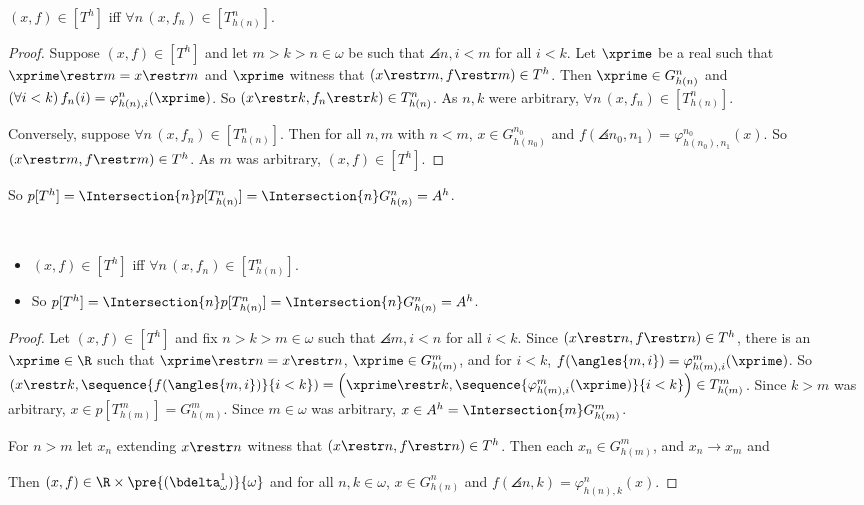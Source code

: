 \documentclass[oneside,12pt]{amsart}
\begin{document}
\begin{proposition}
$(x,f) \in [T^h]$ iff $\forall n \, (x,f_n)\in[T^n_{h(n)}]$.
\end{proposition}
\begin{proof}
Suppose $(x,f) \in [T^h]$ and let $m > k > n \in \omega$
be such that $\angles{n,i}<m$ for all $i<k$. Let $\xprime$ be a real
such that $\xprime\restr m = x \restr m$ and $\xprime$ witness that
$(x\restr m, f\restr m)\in T^h$. Then $\xprime\in G^n_{h(n)}$
and $(\forall i < k)\, f_n(i)=\varphi^{n}_{h(n),i}(\xprime)$.
So $(x\restr k, f_n\restr k)\in T^n_{h(n)}$.
As $n,k$ were arbitrary, $\forall n \, (x,f_n)\in[T^n_{h(n)}]$.

Conversely, suppose $\forall n \, (x,f_n)\in[T^n_{h(n)}]$.
Then for all $n,m$ with $n<m$, $x\in G^{n_0}_{h(n_0)}$ and $f(\angles{n_0,n_1}) = \varphi^{n_0}_{h(n_0),n_1}(x)$.
So $(x\restr m, f\restr m) \in T^h$. As $m$ was arbitrary, $(x,f) \in [T^h]$.
\end{proof}

\begin{remark}
So $p[T^h] = \Intersection{n} p[T^n_{h(n)}] = \Intersection{n} G^n_{h(n)} = A^h$.
\end{remark}

\begin{remarks} \
\begin{itemize}
\item $(x,f) \in [T^h]$ iff $\forall n \, (x,f_n)\in[T^n_{h(n)}]$.
\item So $p[T^h] = \Intersection{n} p[T^n_{h(n)}] = \Intersection{n} G^n_{h(n)} = A^h$.
\end{itemize}
\end{remarks}
\begin{proof}
Let $(x,f)\in[T^h]$ and fix $n > k > m\in\omega$ such that $\angles{m,i} < n$ for all $i<k$.
Since $(x\restr n, f\restr n) \in T^h$,
there is an $\xprime\in\R$ such that $\xprime\restr n = x\restr n$, $\xprime\in G^m_{h(m)}$,
and for $i<k$, $f(\angles{m,i}) = \varphi^{m}_{h(m),i}(\xprime)$.
So $\left(x\restr k, \sequence{f(\angles{m,i})}{i<k}\right)
=\left(\xprime\restr k, \sequence{\varphi^m_{h(m),i}(\xprime)}{i<k}\right)\in T^m_{h(m)}$.
Since $k>m$ was arbitrary, $x\in p[T^m_{h(m)}] = G^m_{h(m)}$.
Since $m\in\omega$ was arbitrary, $x\in A^h = \Intersection{m} G^m_{h(m)}$.

For $n > m$ let $x_n$ extending $x\restr n$ witness that
$(x\restr n, f\restr n) \in T^h$. Then each $x_n\in G^m_{h(m)}$, and $x_n\rightarrow x_m$ and


Then $(x,f) \in \R \times \pre{(\bdelta^1_{\omega})}{\omega}$
and for all $n,k\in\omega$, $x\in G^n_{h(n)}$ and $f(\angles{n,k}) = \varphi^n_{h(n),k}(x)$.
\end{proof}
\end{document}
